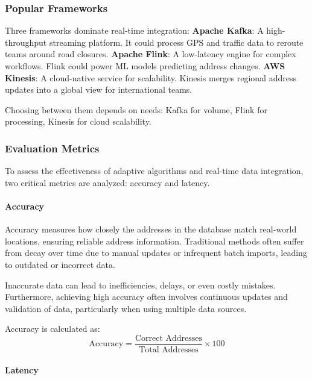         \subsubsection{Popular Frameworks}

        Three frameworks dominate real-time integration: \blankLine
        \textbf{Apache Kafka}: A high-throughput streaming platform. It could process GPS and traffic data to reroute teams around road closures.\blankLine
        \textbf{Apache Flink}: A low-latency engine for complex workflows. Flink could power ML models predicting address changes.\blankLine
        \textbf{AWS Kinesis}: A cloud-native service for scalability. Kinesis merges regional address updates into a global view for international teams.\blankLine
        
        Choosing between them depends on needs: Kafka for volume, Flink for processing, Kinesis for cloud scalability. \autocite{Ranjbary2024Sep}


        \subsubsection{Evaluation Metrics}
        \label{sec:evaluation-metrics}

        To assess the effectiveness of adaptive algorithms and real-time data integration, two critical metrics are analyzed: accuracy and latency.

        \paragraph{Accuracy}
        \label{par:accuracy}

        Accuracy measures how closely the addresses in the database match real-world locations, ensuring reliable address information. Traditional methods often suffer from decay over time due to manual updates or infrequent batch imports, leading to outdated or incorrect data.  \blankLine

        Inaccurate data can lead to inefficiencies, delays, or even costly mistakes. Furthermore, achieving high accuracy often involves continuous updates and validation of data, particularly when using multiple data sources. 

        Accuracy is calculated as:
        \[
        \text{Accuracy} = \frac{\text{Correct Addresses}}{\text{Total Addresses}} \times 100
        \]
        \autocite{GeeksforGeeks2024Oct}\blankLine
    

        \paragraph{Latency}
        \label{par:latency}

